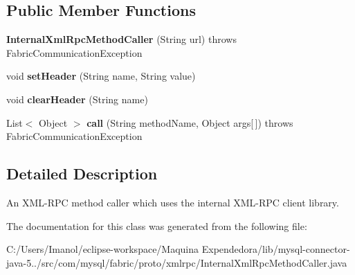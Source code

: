 \subsection*{Public Member Functions}
\begin{DoxyCompactItemize}
\item 
\mbox{\label{classcom_1_1mysql_1_1fabric_1_1proto_1_1xmlrpc_1_1_internal_xml_rpc_method_caller_ac96430c2947d63ec0b3753b7497063e3}} 
{\bfseries Internal\+Xml\+Rpc\+Method\+Caller} (String url)  throws Fabric\+Communication\+Exception 
\item 
\mbox{\label{classcom_1_1mysql_1_1fabric_1_1proto_1_1xmlrpc_1_1_internal_xml_rpc_method_caller_ae1ab470c39165f3ba0e06f805d7730cd}} 
void {\bfseries set\+Header} (String name, String value)
\item 
\mbox{\label{classcom_1_1mysql_1_1fabric_1_1proto_1_1xmlrpc_1_1_internal_xml_rpc_method_caller_aaa8e925fafa0dba551270bf329329f5d}} 
void {\bfseries clear\+Header} (String name)
\item 
\mbox{\label{classcom_1_1mysql_1_1fabric_1_1proto_1_1xmlrpc_1_1_internal_xml_rpc_method_caller_a3f0c8d7d34e76ede15209b08c73e12d7}} 
List$<$ Object $>$ {\bfseries call} (String method\+Name, Object args\mbox{[}$\,$\mbox{]})  throws Fabric\+Communication\+Exception 
\end{DoxyCompactItemize}


\subsection{Detailed Description}
An X\+M\+L-\/\+R\+PC method caller which uses the internal X\+M\+L-\/\+R\+PC client library. 

The documentation for this class was generated from the following file\+:\begin{DoxyCompactItemize}
\item 
C\+:/\+Users/\+Imanol/eclipse-\/workspace/\+Maquina Expendedora/lib/mysql-\/connector-\/java-\/5../src/com/mysql/fabric/proto/xmlrpc/Internal\+Xml\+Rpc\+Method\+Caller.\+java\end{DoxyCompactItemize}

